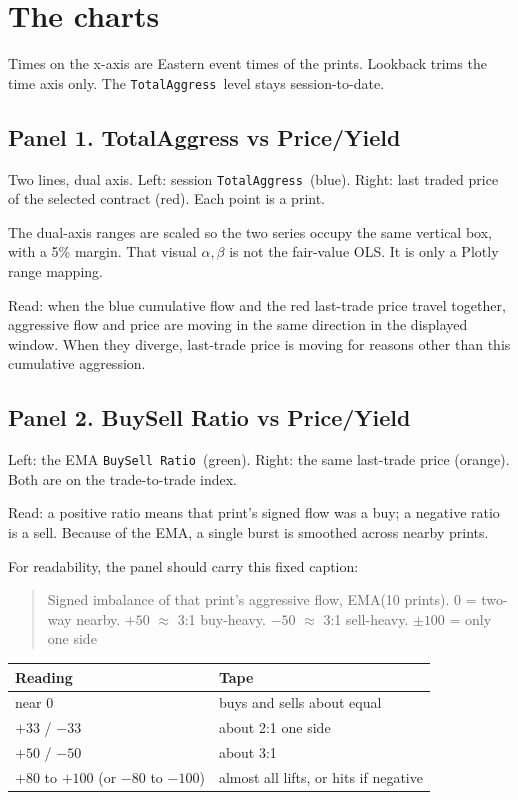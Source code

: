 \documentclass[11pt]{article}
\newcommand{\TotalAggress}{\texttt{TotalAggress}}
\newcommand{\BuySell}{\texttt{BuySell Ratio}}
\begin{document}
\section{The charts}

Times on the x-axis are Eastern event times of the prints. Lookback trims the time axis only. The \TotalAggress\ level stays session-to-date.

\subsection{Panel 1. TotalAggress vs Price/Yield}

Two lines, dual axis. Left: session \TotalAggress\ (blue). Right: last traded price of the selected contract (red). Each point is a print.

The dual-axis ranges are scaled so the two series occupy the same vertical box, with a 5\% margin. That visual $\alpha,\beta$ is not the fair-value OLS. It is only a Plotly range mapping.

Read: when the blue cumulative flow and the red last-trade price travel together, aggressive flow and price are moving in the same direction in the displayed window. When they diverge, last-trade price is moving for reasons other than this cumulative aggression.

\subsection{Panel 2. BuySell Ratio vs Price/Yield}

Left: the EMA \BuySell\ (green). Right: the same last-trade price (orange). Both are on the trade-to-trade index.

Read: a positive ratio means that print's signed flow was a buy; a negative ratio is a sell. Because of the EMA, a single burst is smoothed across nearby prints. 

For readability, the panel should carry this fixed caption:
\begin{quote}
Signed imbalance of that print's aggressive flow, EMA(10 prints). \(0\) = two-way nearby. \(+50\) \(\approx\) 3:1 buy-heavy. \(-50\) \(\approx\) 3:1 sell-heavy. \(\pm 100\) = only one side
\end{quote}

\begin{center}
\begin{tabular}{@{}p{}p{}@{}}
\toprule
\textbf{Reading} & \textbf{Tape} \\
\midrule
near \(0\) & buys and sells about equal \\
\(+33\) / \(-33\) & about 2:1 one side \\
\(+50\) / \(-50\) & about 3:1 \\
\(+80\) to \(+100\) (or \(-80\) to \(-100\)) & almost all lifts, or hits if negative \\
\bottomrule
\end{tabular}
\end{center}
\end{document}
